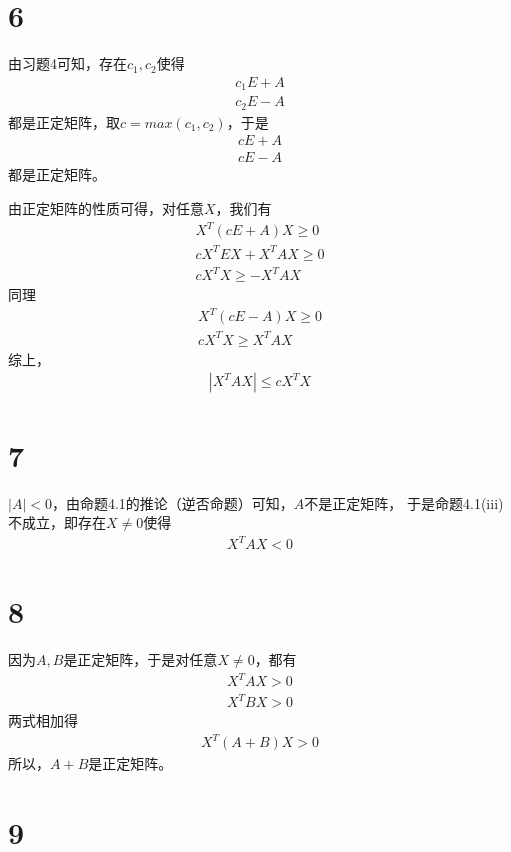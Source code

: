 \documentclass{article}
\begin{document}
\section*{6}

由习题4可知，存在$c_1, c_2$使得
\begin{align*}
  c_1 E + A \\
  c_2 E - A
\end{align*}
都是正定矩阵，取$c = max(c_1, c_2)$，于是
\begin{align*}
  c E + A \\
  c E - A
\end{align*}
都是正定矩阵。

由正定矩阵的性质可得，对任意$X$，我们有
\begin{align*}
  X^T (c E + A) X \geq 0    \\
  cX^T E X + X^T A X \geq 0 \\
  cX^T  X \geq - X^T A X
\end{align*}
同理
\begin{align*}
  X^T (c E - A) X \geq 0 \\
  cX^T X \geq X^T A X
\end{align*}
综上，
\begin{align*}
  |X^T A X| \leq c X^T X
\end{align*}

\section*{7}

$|A| < 0$，由命题4.1的推论（逆否命题）可知，$A$不是正定矩阵，
于是命题4.1(iii)不成立，即存在$X \neq 0$使得
\begin{align*}
  X^T A X < 0
\end{align*}

\section*{8}

因为$A, B$是正定矩阵，于是对任意$X \neq 0$，都有
\begin{align*}
  X^T A X > 0 \\
  X^T B X > 0
\end{align*}
两式相加得
\begin{align*}
  X^T (A + B) X > 0
\end{align*}
所以，$A + B$是正定矩阵。

\section*{9}
\end{document}
